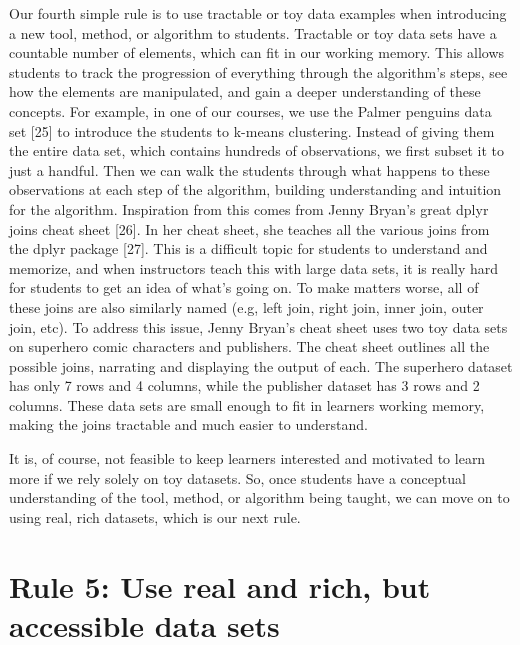 \documentclass[
  10pt,
  letterpaper,
]{article}
\begin{document}
Our fourth simple rule is to use tractable or toy data examples when
introducing a new tool, method, or algorithm to students. Tractable or
toy data sets have a countable number of elements, which can fit in our
working memory. This allows students to track the progression of
everything through the algorithm's steps, see how the elements are
manipulated, and gain a deeper understanding of these concepts. For
example, in one of our courses, we use the Palmer penguins data set
{[}25{]} to introduce the students to k-means clustering. Instead of
giving them the entire data set, which contains hundreds of
observations, we first subset it to just a handful. Then we can walk the
students through what happens to these observations at each step of the
algorithm, building understanding and intuition for the algorithm.
Inspiration from this comes from Jenny Bryan's great dplyr joins cheat
sheet {[}26{]}. In her cheat sheet, she teaches all the various joins
from the dplyr package {[}27{]}. This is a difficult topic for students
to understand and memorize, and when instructors teach this with large
data sets, it is really hard for students to get an idea of what's going
on. To make matters worse, all of these joins are also similarly named
(e.g, left join, right join, inner join, outer join, etc). To address
this issue, Jenny Bryan's cheat sheet uses two toy data sets on
superhero comic characters and publishers. The cheat sheet outlines all
the possible joins, narrating and displaying the output of each. The
superhero dataset has only 7 rows and 4 columns, while the publisher
dataset has 3 rows and 2 columns. These data sets are small enough to
fit in learners working memory, making the joins tractable and much
easier to understand.

It is, of course, not feasible to keep learners interested and motivated
to learn more if we rely solely on toy datasets. So, once students have
a conceptual understanding of the tool, method, or algorithm being
taught, we can move on to using real, rich datasets, which is our next
rule.

\section{Rule 5: Use real and rich, but accessible data
sets}\label{sec-rule5}
\end{document}
